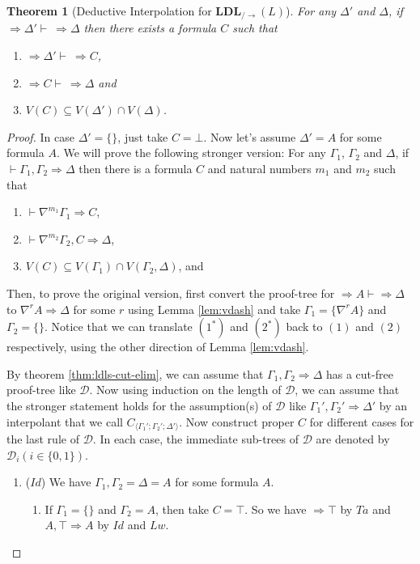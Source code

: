 \documentclass[12pt,a4paper]{article}
\theoremstyle{plain}
\newtheorem{thm}{Theorem}[section]
\theoremstyle{definition}
\begin{document}
\begin{thm}[Deductive Interpolation for $\mathbf{LDL}_{/\rightarrow}(L)$] For any $\Delta'$ and $\Delta$, if $\Rightarrow \Delta' \vdash\ \Rightarrow \Delta$ then there exists a formula $C$ such that
	\begin{enumerate}[label=(\arabic*)]
		\item $\Rightarrow \Delta' \vdash\ \Rightarrow C$,
		\item $\Rightarrow C \vdash\ \Rightarrow \Delta$ and
		\item $V(C) \subseteq V(\Delta') \cap V(\Delta)$.
	\end{enumerate}
\end{thm}
\begin{proof}
	In case $\Delta' = \{\}$, just take $C = \bot$. Now let's assume $\Delta' = A$ for some formula $A$. We will prove the following stronger version: For any $\Gamma_1$, $\Gamma_2$ and $\Delta$, if $\vdash \Gamma_1 , \Gamma_2 \Rightarrow \Delta$ then there is a formula $C$ and natural numbers $m_1$ and $m_2$ such that
	\begin{enumerate}[label=(\arabic**)]
		\item $\vdash \nabla^{m_1} \Gamma_1 \Rightarrow C$,
		\item $\vdash \nabla^{m_2} \Gamma_2 , C \Rightarrow \Delta$,
		\item $V(C) \subseteq V(\Gamma_1) \cap V(\Gamma_2,\Delta)$, and
	\end{enumerate}

	Then, to prove the original version, first convert the proof-tree for $\Rightarrow A \vdash \Rightarrow \Delta$ to $\nabla^r A \Rightarrow \Delta$ for some $r$ using Lemma \ref{lem:vdash} and take $\Gamma_1 = \{\nabla^r A \}$ and $\Gamma_2 = \{\}$. Notice that we can translate $(1^*)$ and $(2^*)$ back to $(\mathit{1})$ and $(\mathit{2})$ respectively, using the other direction of Lemma \ref{lem:vdash}.
	
	By theorem \ref{thm:ldls-cut-elim}, we can assume that $\Gamma_1, \Gamma_2 \Rightarrow \Delta$ has a cut-free proof-tree like $\mathcal{D}$. Now using induction on the length of $\mathcal{D}$, we can assume that the stronger statement holds for the assumption(s) of $\mathcal{D}$ like $\Gamma_1', \Gamma_2' \Rightarrow \Delta'$ by an interpolant that we call $C_{\langle\Gamma_1';\Gamma_2';\Delta'\rangle}$.
	Now construct proper $C$ for different cases for the last rule of $\mathcal{D}$. In each case, the immediate sub-trees of $\mathcal{D}$ are denoted by $\mathcal{D}_i (i \in \{0,1\})$.
	\begin{enumerate}
		\item ($Id$) We have $\Gamma_1,\Gamma_2 = \Delta = A$ for some formula $A$.
		\begin{enumerate}
			\item If $\Gamma_1 = \{\}$ and $\Gamma_2 = A$, then take $C = \top$. So we have $\Rightarrow \top$ by $Ta$ and $A , \top \Rightarrow A$ by $Id$ and $Lw$.


\end{enumerate}
\end{enumerate}
\end{proof}
\end{document}
